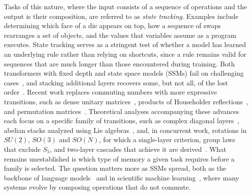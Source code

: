 \documentclass[aps,prx,reprint,superscriptaddress,longbibliography,nofootinbib,floatfix]{revtex4-2}
\theoremstyle{plain}
\theoremstyle{definition}
\begin{document}
Tasks of this nature, where the input consists of a sequence of operations and the
output is their composition, are referred to as \emph{state tracking}. Examples
include determining which face of a die appears on top, how a sequence of swaps
rearranges a set of objects, and the values that variables assume as a program executes. State tracking serves as a stringent test of whether a model has learned an underlying rule rather than relying on shortcuts, since a rule remains valid for sequences that are much longer than those encountered during training. Both transformers with fixed depth and state space models (SSMs) fail on challenging cases~\cite{merrill_illusion,grazzi,sarrof}, and stacking additional layers
recovers some, but not all, of the lost order~\cite{shakerinava,heo}.
Recent work replaces commuting numbers with more expressive transitions, such as dense unitary matrices~\cite{unitary_rnn}, products of Householder
reflections~\cite{grazzi,deltaproduct}, and permutation matrices~\cite{pdssm}. Theoretical analyses accompanying these advances each focus on a specific
family of transitions, such as complex diagonal layers~\cite{shakerinava},
abelian stacks analyzed using Lie algebras~\cite{heo}, and, in concurrent
work, rotations in $SU(2)$, $SO(3)$ and $SO(N)$, for which a single-layer
criterion, group laws that exclude $S_5$, and two-layer cascades that
achieve it are derived~\cite{jia_ncssm}. What remains unestablished is which type of memory a given task requires before a family is selected. The question matters more as SSMs spread, both as the backbone of language models~\cite{gu_mamba,dao_mamba2,jamba,griffin,nemotronh,falconh1} and in scientific machine learning~\cite{hu_ssm_operator,zheng_mambano}, where many
systems evolve by composing operations that do not commute.
\end{document}
